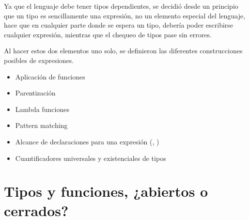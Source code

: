 \begin{blueleft}
Ya que el lenguaje debe tener tipos dependientes, se decidió desde un principio que un tipo es sencillamente una expresión, no un elemento especial del lenguaje, hace que en cualquier parte donde se espera un tipo, debería poder escribirse cualquier expresión, mientras que el chequeo de tipos pase sin errores.

Al hacer estos dos elementos uno solo, se definieron las diferentes construcciones posibles de expresiones.

\begin{itemize}
    \item Aplicación de funciones
    \item Parentización
    \item Lambda funciones
    \item Pattern matching
    \item Alcance de declaraciones para una expresión (, )
    \item Cuantificadores universales y existenciales de tipos
\end{itemize}
\end{blueleft}

\section{Tipos y funciones, ¿abiertos o cerrados?}


